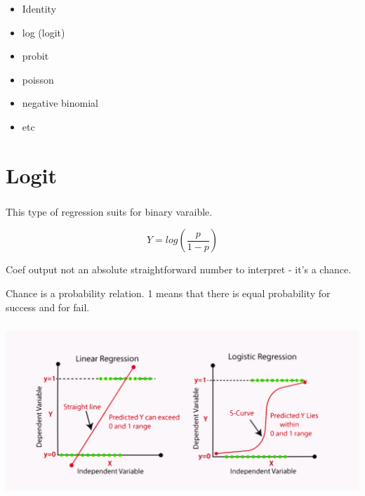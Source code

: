 \documentclass[t, 11pt]{beamer}
\begin{document}
	\begin{frame} 
		\frametitle{\insertsection} 
		\begin{itemize}
			\item Identity
			\item log (logit)
			\item probit
			\item poisson
			\item negative binomial
			\item etc
		\end{itemize}
	\end{frame}	

\section{Logit}
	
	\begin{frame} 
		\frametitle{\insertsection} 
	This type of regression suits for binary varaible.  
	\begin{center}
		\begin{equation}
			Y = log(\frac{p}{1 -p})
		\end{equation}
	\end{center}
	Coef output not an absolute straightforward number to interpret - it's a chance. 
	
	Chance is a probability relation. 1 means that there is equal probability for success and for fail.  
	\end{frame}	

\begin{frame}
	\frametitle{\insertsection} 
\begin{center}
	\includegraphics[scale=0.23]{logit}
\end{center}
\end{frame}	
\end{document}
